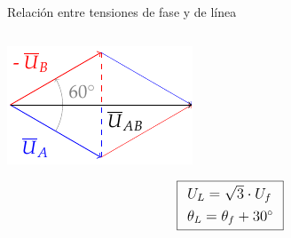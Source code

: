 \documentclass[aspectratio=169, usenames,svgnames,dvipsnames]{beamer}
\begin{document}
\begin{frame}{Relación entre tensiones de fase y de línea}
\begin{columns}
    \begin{column}{0.5\columnwidth}
    \begin{center}
    \includegraphics[width=.65\linewidth]{../figs/FasoresFaseLinea.pdf}
    \end{center}
    
    \[
      \large{\boxed{
        \begin{array}{l}
          U_L = \sqrt{3}\cdot U_f\\[4pt]
          \theta_L = \theta_f + \ang{30}\\
        \end{array}
      }}
    \]
    \end{column}
    \end{columns}
\end{frame}

\end{document}
